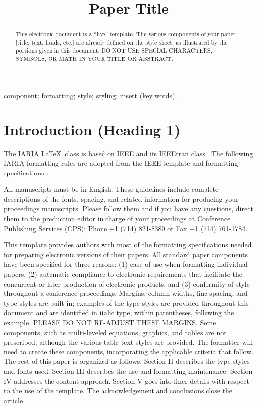 \documentclass[conference,flushend]{iaria-lite}
\title{Paper Title}
\author{
    \IEEEauthorblockN{Authors Name/s per 1st Affiliation \emph{(Author)}}
    \IEEEauthorblockA{%
        line 1 (of Affiliation): dept.\ name of organization\\
        line 2: name of organization, acronyms acceptable\\
        line 3: City, Country\\
        line 4: e-mail: {\tt name@xyz.com}
    }
}
\begin{document}
\maketitle

\begin{abstract}
This electronic document is a “live” template. The various components of your paper [title, text, heads, etc.] are already defined on the style sheet, as illustrated by the portions given in this document. DO NOT USE SPECIAL CHARACTERS, SYMBOLS, OR MATH IN YOUR TITLE OR ABSTRACT.
\end{abstract}

\begin{IEEEkeywords}
component; formatting; style; styling; insert (key words).
\end{IEEEkeywords}

\section{Introduction (Heading 1)}

The IARIA \LaTeX\ class is based on IEEE and its IEEEtran class \cite{ieee2015howto}.
The following IARIA formatting rules are adopted from the IEEE template and formatting specifications \cite{ieee2018formattingrules}.

All manuscripts must be in English. These guidelines include complete descriptions of the fonts, spacing, and related information for producing your proceedings manuscripts. Please follow them and if you have any questions, direct them to the production editor in charge of your proceedings at Conference Publishing Services (CPS): Phone +1 (714) 821-8380 or Fax +1 (714) 761-1784.

This template provides authors with most of the formatting specifications needed for preparing electronic versions of their papers. All standard paper components have been specified for three reasons: (1) ease of use when formatting individual papers, (2) automatic compliance to electronic requirements that facilitate the concurrent or later production of electronic products, and (3) conformity of style throughout a conference proceedings. Margins, column widths, line spacing, and type styles are built-in; examples of the type styles are provided throughout this document and are identified in italic type, within parentheses, following the example. PLEASE DO NOT RE-ADJUST THESE MARGINS. Some components, such as multi-leveled equations, graphics, and tables are not prescribed, although the various table text styles are provided. The formatter will need to create these components, incorporating the applicable criteria that follow. The rest of this paper is organized as follows. Section II describes the type styles and fonts used. Section III describes the use and formatting maintenance. Section IV addresses the content approach. Section V goes into finer details with respect to the use of the template.  The acknowledgement and conclusions close the article.
\end{document}
